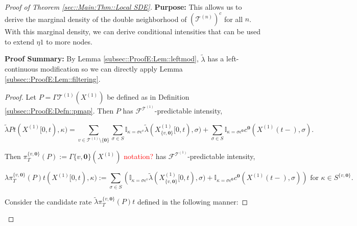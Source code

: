 \documentclass[12pt]{article}
\newcommand{\mb}{\mathbb}
\newcommand{\mc}{\mathcal}
\newcommand{\te}{\text}
\newcommand{\ep}{\epsilon}
\newcommand{\tr}{\textcolor{red}}
\newcommand{\purpose}{\textbf{Purpose: }}
\newcommand{\pfsum}{\textbf{Proof Summary: }}
\newcommand{\defeq}{:=}								%
\renewcommand{\root}{\mathbf{0}}				%
\renewcommand{\v}{v}							%
\renewcommand{\S}{S}							%
\newcommand{\s}{\sigma}							%
\newcommand{\ev}{\ep}							%
\newcommand{\T}{T}								%
\renewcommand{\t}{t}							%
\newcommand{\proj}{\pi}							%
\newcommand{\F}{\mc{F}}							%
\newcommand{\X}{X}								%
\newcommand{\IGr}{c}							%
\newcommand{\vind}[1]{^{#1}}					%
\newcommand{\carp}[1]{^{#1}}					%
\newcommand{\vsi}[1]{^{#1}}						%
\newcommand{\cind}[1]{_{#1}}					%
\newcommand{\tp}[1]{(#1)}						%
\newcommand{\tip}[1]{#1}						%
\newcommand{\ts}[1]{_{#1}}						%
\newcommand{\tree}{\mc{T}}						%
\newcommand{\sln}[1]{^{(#1)}}						%
\newcommand{\rate}{\lambda}						%
\newcommand{\alt}[1]{\widetilde{#1}}			%
\newcommand{\mmm}{\eta}							%
\newcommand{\pmap}{\Gamma}						%
\renewcommand{\mark}{\kappa}					%
\newcommand{\rp}{P}								%
\newcommand{\crate}{\alt{\lambda}}				%
\begin{document}
\begin{proof}[Proof of Theorem \ref{sec::Main:Thm::Local SDE}]
\purpose This allows us to derive the marginal density of the double neighborhood of \((\tree\sln{n})^c\) for all \(n\). With this marginal density, we can derive conditional intensities that can be used to extend \(\mmm{}{}{1}\) to more nodes.

\pfsum By Lemma \ref{subsec::ProofE:Lem::leftmod}, \(\crate{}{}\) has a left-continuous modification so we can directly apply Lemma \ref{subsec::ProofE:Lem::filtering}.

\begin{proof}
Let \(\rp{} = \pmap{\tree\sln{1}}(\X\sln{1}\cind{}\tip{})\) be defined as in Definition \ref{subsec::ProofE:Defn::pmap}. Then \(\rp{}\) has \(\F\vsi{\tree\sln{1}}\ts{}\)-predictable intensity,

\[\crate{\rp{}}{\t}(\X\sln{1}\cind{}\tip{[0,\t)},\mark{}) = \sum_{\v\in \tree\sln{1}\setminus\{\root\}}\sum_{\s\in \S} \mb{I}_{\mark{} = \s\ev\vind{\v}}\crate{}{}(\X\sln{1}\cind{\{\v,\root\}}\tip{[0,\t)},\s) + \sum_{\s\in\S}\mb{I}_{\mark{} = \s\ev\vind{\root}}\IGr\vind{\root}(\X\sln{1}\cind{}\tp{\t-},\s).\]

Then \(\proj\vsi{\{\v,\root\}}\ts{\T}(\rp{})\defeq \pmap{\{\v,\root\}}(\X\sln{1}\cind{}\tip{})\) \tr{notation?} has \(\F\vsi{\tree\sln{1}}\ts{}\)-predictable intensity,

\[\rate{\proj\vsi{\{\v,\root\}}\ts{\T}(\rp{})}{\t}(\X\sln{1}\cind{}\tip{[0,\t)},\mark{}) \defeq \sum_{\s\in \S} \left(\mb{I}_{\mark{} = \s\ev\vind{\v}}\crate{}{}(\X\sln{1}\cind{\{\v,\root\}}\tip{[0,\t)},\s) + \mb{I}_{\mark{} = \s\ev\vind{\root}}\IGr\vind{\root}(\X\sln{1}\cind{}\tp{\t-},\s)\right)\te{ for } \kappa \in \S\carp{\{\v,\root\}}.\]

Consider the candidate rate \(\crate{\proj\vsi{\{\v,\root\}}\ts{\T}(\rp{})}{\t}\) defined in the following manner:


\end{proof}
\end{proof}
\end{document}
